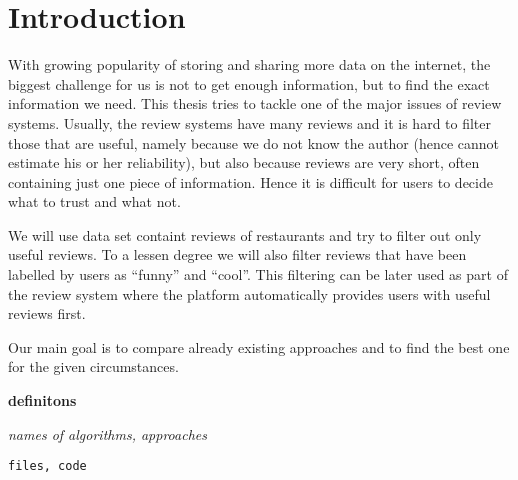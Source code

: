 \chapter*{Introduction}

With growing popularity of storing and sharing more data on the internet, the biggest challenge
for us is not to get enough information, but to find the exact information we need. This thesis tries to tackle
one of the major issues of review systems. Usually, the review systems have many reviews and it is
hard to filter those that are useful, namely because we do not know the author (hence cannot estimate
his or her reliability), but also because reviews are very short, often containing just one piece of information.
Hence it is difficult for users to decide what to trust and what not.

We will use data set containt reviews of restaurants and try to 
filter out only useful reviews. To a lessen degree we will also filter reviews that have been labelled by users as ``funny'' and ``cool''.
This filtering can be later used as part of the review system where the platform automatically provides users with useful reviews first.

Our main goal is to compare already existing approaches and to find the best one for the given circumstances.





{\bf definitons}

{\it names of algorithms, approaches}

\texttt{files, code}

